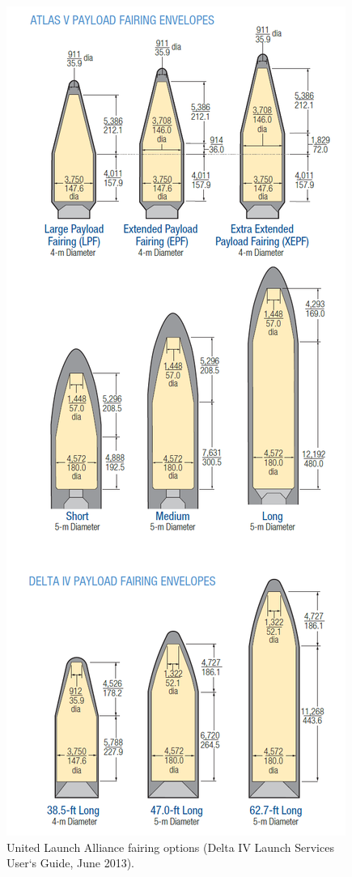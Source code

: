 \begin{figure}[h!]
\centering
\includegraphics[scale=0.4]{figures/Orbiter/fairings.png}
\caption{United Launch Alliance fairing options (Delta IV Launch Services User‘s Guide, June 2013).\cite{Atlasm}}
\end{figure}

